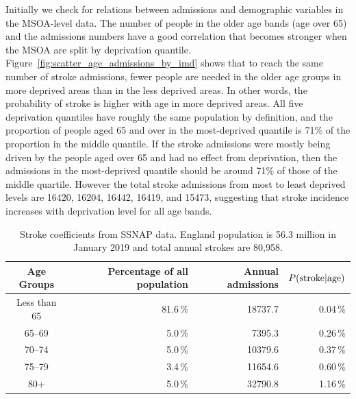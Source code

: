 \documentclass[12pt]{extarticle}
\begin{document}
Initially we check for relations between admissions and demographic variables in the MSOA-level data.
% 
The number of people in the older age bands (age over 65) and the admissions numbers have a good correlation that becomes stronger when the MSOA are split by deprivation quantile.
% 
Figure~\ref{fig:scatter_age_admissions_by_imd} shows that
to reach the same number of stroke admissions, fewer people are needed in the older age groups in more deprived areas than in the less deprived areas. In other words, the probability of stroke is higher with age in more deprived areas.
% 
All five deprivation quantiles have roughly the same population by definition, and the proportion of people aged 65 and over in the most-deprived quantile is 71\% of the proportion in the middle quantile.
If the stroke admissions were mostly being driven by the people aged over 65 and had no effect from deprivation,
then the admissions in the most-deprived quantile should be around 71\% of those of the middle quartile.
However the total stroke admissions from most to least deprived levels are 16420, 16204, 16442, 16419, and 15473,
suggesting that stroke incidence increases with deprivation level for all age bands.


\begin{table}
\centering
    \caption{Stroke coefficients from SSNAP data. England population is 56.3 million in January 2019 and total annual strokes are 80,958.}
    \begin{tabular}{crrr}
    Age Groups & Percentage of all population & Annual admissions & $P(\textnormal{stroke} | \textnormal{age})$ \\%
    \hline
    Less than 65 & 81.6\,\% & 18737.7 & 0.04\,\% \\
    65--69 & 5.0\,\% & 7395.3 & 0.26\,\% \\
    70--74 & 5.0\,\% & 10379.6 & 0.37\,\% \\
    75--79 & 3.4\,\% & 11654.6 & 0.60\,\% \\
    80+ & 5.0\,\% & 32790.8 & 1.16\,\% \\
    \end{tabular}
    \label{tab:ssnap_coeffs}
\end{table}
\end{document}
